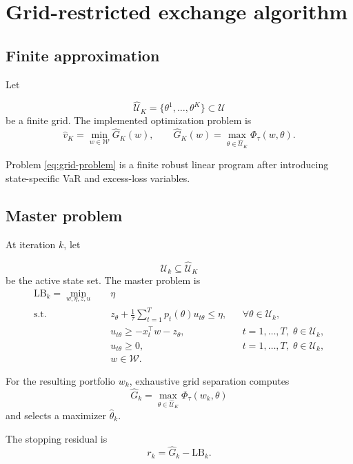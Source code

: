 \documentclass[11pt,a4paper]{article}
\theoremstyle{definition}
\theoremstyle{remark}
\newcommand{\U}{\mathcal{U}}
\newcommand{\Ugrid}{\widehat{\mathcal{U}}}
\newcommand{\W}{\mathcal{W}}
\begin{document}
\section{Grid-restricted exchange algorithm}

\subsection{Finite approximation}

Let

\[
\Ugrid_K=\{\theta^1,\ldots,\theta^K\}\subset\U
\]
be a finite grid. The implemented optimization problem is
\begin{equation}
\widehat v_K
=
\min_{w\in\W}
\widehat G_K(w),
\qquad
\widehat G_K(w)
=
\max_{\theta\in\Ugrid_K}
\Phi_\tau(w,\theta).
\label{eq:grid-problem}
\end{equation}

Problem \eqref{eq:grid-problem} is a finite robust linear program after
introducing state-specific VaR and excess-loss variables.

\subsection{Master problem}

At iteration \(k\), let

\[
\U_k\subseteq\Ugrid_K
\]
be the active state set. The master problem is
\begin{align}
\mathrm{LB}_k
=
\min_{w,\eta,z,u}\quad
&\eta
\\
\text{s.t.}\quad
&z_\theta+
\frac1{\tau}
\sum_{t=1}^{T}p_t(\theta)u_{t\theta}
\le\eta,
&&\forall\theta\in\U_k,
\\
&u_{t\theta}\ge -x_t^\top w-z_\theta,
&&t=1,\ldots,T,\;\theta\in\U_k,
\\
&u_{t\theta}\ge0,
&&t=1,\ldots,T,\;\theta\in\U_k,
\\
&w\in\W.
\label{eq:master}
\end{align}

For the resulting portfolio \(w_k\), exhaustive grid separation computes
\begin{equation}
\widehat G_k
=
\max_{\theta\in\Ugrid_K}\Phi_\tau(w_k,\theta)
\label{eq:grid-separation}
\end{equation}
and selects a maximizer \(\widehat\theta_k\).

The stopping residual is
\begin{equation}
r_k=\widehat G_k-\mathrm{LB}_k.
\label{eq:grid-residual}
\end{equation}
\end{document}
